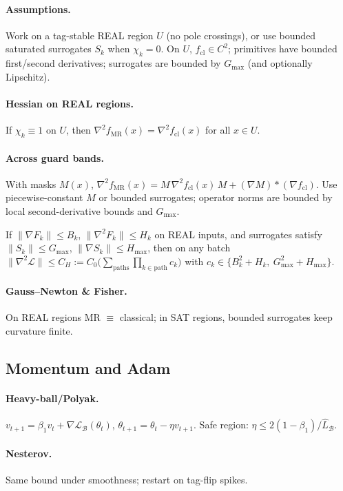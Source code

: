 \documentclass[twoside,11pt]{article}
\begin{document}
\paragraph{Assumptions.} Work on a tag-stable REAL region $U$ (no pole crossings), or use bounded saturated surrogates $S_k$ when $\chi_k=0$. On $U$, $f_{\mathrm{cl}}\in C^2$; primitives have bounded first/second derivatives; surrogates are bounded by $G_{\max}$ (and optionally Lipschitz).
\paragraph{Hessian on REAL regions.} If $\chi_k\equiv 1$ on $U$, then $\nabla^2 f_{\mathrm{MR}}(x)=\nabla^2 f_{\mathrm{cl}}(x)$ for all $x\in U$.
\paragraph{Across guard bands.} With masks $M(x)$, $\nabla^2 f_{\mathrm{MR}}(x)=M\,\nabla^2 f_{\mathrm{cl}}(x)\,M + (\nabla M)\ast(\nabla f_{\mathrm{cl}})$. Use piecewise-constant $M$ or bounded surrogates; operator norms are bounded by local second-derivative bounds and $G_{\max}$.
\begin{proposition}\label{prop:bounded-hessian}
If $\|\nabla F_k\|\le B_k$, $\|\nabla^2 F_k\|\le H_k$ on REAL inputs, and surrogates satisfy $\|S_k\|\le G_{\max}$, $\|\nabla S_k\|\le H_{\max}$, then on any batch $\|\nabla^2 \mathcal{L}\|\le C_H := C_0\big( \sum_{\text{paths}} \prod_{k\in \text{path}} c_k \big)$ with $c_k\in\{B_k^2+H_k,\ G_{\max}^2+H_{\max}\}$.
\end{proposition}
\paragraph{Gauss--Newton \& Fisher.} On REAL regions MR $\equiv$ classical; in SAT regions, bounded surrogates keep curvature finite.
\subsection*{Momentum and Adam}
\paragraph{Heavy-ball/Polyak.} $v_{t+1}=\beta_1 v_t+\nabla\mathcal{L}_\mathcal{B}(\theta_t)$, $\theta_{t+1}=\theta_t-\eta v_{t+1}$. Safe region: $\eta \le 2(1-\beta_1)/\widehat L_\mathcal{B}$.
\paragraph{Nesterov.} Same bound under smoothness; restart on tag-flip spikes.
\end{document}
